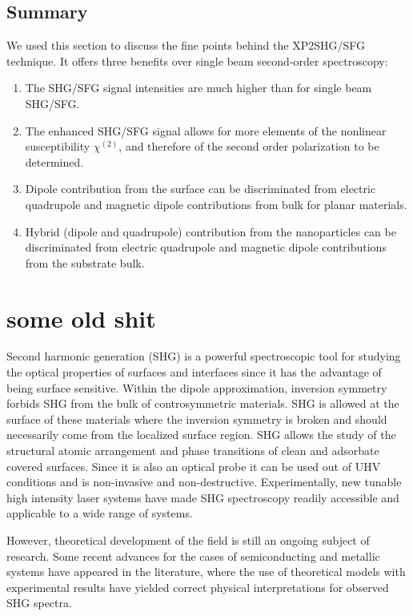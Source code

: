 \documentclass[10pt]{article}
\begin{document}
\subsection{Summary}
We used this section to discuss the fine points behind the XP2SHG/SFG technique. It offers three benefits over single beam second-order spectroscopy:

\begin{enumerate}
\item The SHG/SFG signal intensities are much higher than for single beam SHG/SFG.
\item The enhanced SHG/SFG signal allows for more elements of the nonlinear susceptibility $\chi^{(2)}$, and therefore of the second order polarization to be determined.
\item Dipole contribution from the surface can be discriminated from electric quadrupole and magnetic dipole contributions from bulk for planar materials.
\item Hybrid (dipole and quadrupole) contribution from the nanoparticles can be discriminated from electric quadrupole and magnetic dipole contributions from the substrate bulk.
\end{enumerate}


\section{some old shit}

Second harmonic generation (SHG) is a powerful spectroscopic tool for studying
the optical properties of surfaces and interfaces since it has the advantage
of being surface sensitive. Within the dipole approximation, inversion
symmetry forbids SHG from the bulk of controsymmetric materials. SHG is
allowed at the surface of these materials where the inversion symmetry is
broken and should necessarily come from the localized surface region. SHG
allows the study of the structural atomic arrangement and phase transitions of
clean and adsorbate covered surfaces. Since it is also an optical probe it can
be used out of UHV conditions and is non-invasive and non-destructive.
Experimentally, new tunable high intensity laser systems have made SHG
spectroscopy readily accessible and applicable to a wide range of
systems.\cite{downerSIA01,lupkeSSR99}

However, theoretical development of the field is still an ongoing subject of
research. Some recent advances for the cases of semiconducting and metallic
systems have appeared in the literature, where the use of theoretical models
with experimental results have yielded correct physical interpretations for
observed SHG spectra. \cite{downerSIA01, mendozaPRB01, limPRB00,
gavrilenkoTSF00, mendozaPRB99, mendozaPRL98, mendozaPRB96b, mendozaPRB97,
guyotPRB90}
\end{document}
